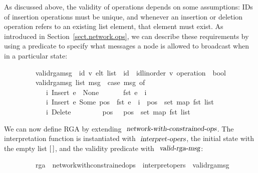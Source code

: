 As discussed above, the validity of operations depends on some assumptions: IDs of insertion operations must be unique, and whenever an insertion or deletion operation refers to an existing list element, that element must exist.
As introduced in Section~\ref{sect.network.ops}, we can describe these requirements by using a predicate to specify what messages a node is allowed to broadcast when in a particular state:
\vspace{0.35em}
\begin{isabellebody}
\ \ \ \ \ \ \ \ \ valid{\isacharunderscore}rga{\isacharunderscore}msg\ {\isacharcolon}{\isacharcolon}\ {\isachardoublequoteopen}{\isacharparenleft}{\isacharprime}id{\isacharcomma}\ {\isacharprime}v{\isacharparenright}\ elt\ list\ {\isasymRightarrow}\ {\isacharprime}id\ {\isasymtimes}\ {\isacharparenleft}{\isacharprime}id{\isacharcolon}{\isacharcolon}linorder{\isacharcomma}\ {\isacharprime}v{\isacharparenright}\ operation\ {\isasymRightarrow}\ bool{\isachardoublequoteclose}\ \isanewline
\ \ \ \ \ \ \ \ \ {\isachardoublequoteopen}valid{\isacharunderscore}rga{\isacharunderscore}msg\ list\ msg\ {\isasymequiv}\ case\ msg\ of\isanewline
\ \ \ \ \ \ \ \ \ \ \ \ {\isacharparenleft}i{\isacharcomma}\ Insert\ e\ \ None\ \ \ \ \ {\isacharparenright}\ {\isasymRightarrow}\ fst\ e\ {\isacharequal}\ i\ {\isacharbar}\isanewline
\ \ \ \ \ \ \ \ \ \ \ \ {\isacharparenleft}i{\isacharcomma}\ Insert\ e\ {\isacharparenleft}Some\ pos{\isacharparenright}{\isacharparenright}\ {\isasymRightarrow}\ fst\ e\ {\isacharequal}\ i\ {\isasymand}\ pos\ {\isasymin}\ set\ {\isacharparenleft}map\ fst\ list{\isacharparenright}\ {\isacharbar}\isanewline
\ \ \ \ \ \ \ \ \ \ \ \ {\isacharparenleft}i{\isacharcomma}\ Delete\ \ \ \ \ \ \ \ \ pos\ {\isacharparenright}\ {\isasymRightarrow}\ pos\ {\isasymin}\ set\ {\isacharparenleft}map\ fst\ list{\isacharparenright}{\isachardoublequoteclose}
\end{isabellebody}
\vspace{0.35em}
We can now define RGA by extending $\isa{network-with-constrained-ops}$. The interpretation function is instantiated with $\isa{interpret-opers}$, the initial state with the empty list $\emph{$[$}\,\emph{$]$}$, and the validity predicate with $\isa{valid-rga-msg}$:
\vspace{0.35em}
\begin{isabellebody}
\ \ \ \ \ \ \ \ \ rga\ {\isacharequal}\ network{\isacharunderscore}with{\isacharunderscore}constrained{\isacharunderscore}ops\ {\isacharunderscore}\ interpret{\isacharunderscore}opers\ {\isachardoublequoteopen}{\isacharbrackleft}{\isacharbrackright}{\isachardoublequoteclose}\ valid{\isacharunderscore}rga{\isacharunderscore}msg
\end{isabellebody}
\vspace{0.35em}

